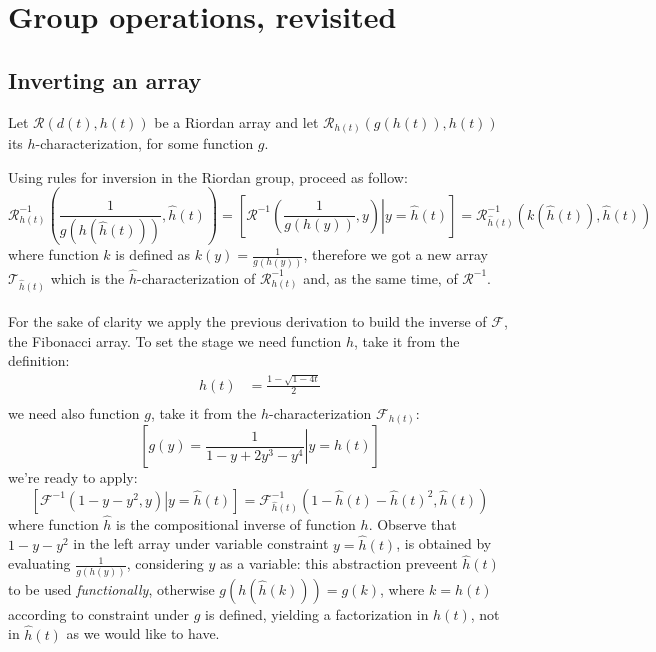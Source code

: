 

\section{Group operations, revisited}

\subsection{Inverting an array}

Let $\mathcal{R}\left(d(t),h(t)\right)$ be a Riordan array and let 
$\mathcal{R}_{h(t)}\left(g(h(t)),h(t)\right)$ its $h$-characterization, for some
function $g$. %
 
Using rules for inversion in the Riordan group, 
proceed as follow:
\begin{displaymath}
    \mathcal{R}_{h(t)}^{-1}\left(\frac{1}{g(h(\hat{h}(t)))},\hat{h}(t)\right)=
    \left[\mathcal{R}^{-1}\left(\left.\frac{1}{g(h(y))},y\right) \right| y = \hat{h}(t) \right]=
    \mathcal{R}_{\hat{h}(t)}^{-1}\left(k(\hat{h}(t)),\hat{h}(t)\right)
\end{displaymath}
where function $k$ is defined as $k(y)=\frac{1}{g(h(y))}$, 
therefore we got a new array $\mathcal{T}_{\hat{h}(t)}$ which is the $\hat{h}$-characterization
of $\mathcal{R}_{h(t)}^{-1}$ and, as the same time, of $\mathcal{R}^{-1}$.
\\\\
For the sake of clarity we apply the previous derivation to build the inverse of $\mathcal{F}$,
the Fibonacci array.  To set the stage we need function $h$, take it from the definition:
\begin{displaymath}
    \begin{split}
        h(t)&=\frac{1-\sqrt{1-4t}}{2}\\
    \end{split}
\end{displaymath}
we need also function $g$, take it from the $h$-characterization $\mathcal{F}_{h(t)}$:
\begin{displaymath}
    \left[g(y)=\left.\frac{1}{1-y+2y^3-y^4} \right| y=h(t)\right]
\end{displaymath}
we're ready to apply:
\begin{displaymath}
    \left[\mathcal{F}^{-1}\left.\left(1-y-y^2,y\right) \right| y = \hat{h}(t) \right]=
    \mathcal{F}_{\hat{h}(t)}^{-1}\left(1-\hat{h}(t)-\hat{h}(t)^2,\hat{h}(t)\right)
\end{displaymath}
where function $\hat{h}$ is the compositional inverse of function $h$. Observe that
$1-y-y^2$ in the left array under variable constraint $y=\hat{h}(t)$, is obtained by
evaluating $\frac{1}{g(h(y))}$, considering $y$ as a variable: this abstraction preveent 
$\hat{h}(t)$ to be used \emph{functionally}, otherwise $g(h(\hat{h}(k)))=g(k)$, where $k=h(t)$
according to constraint under $g$ is defined, yielding a factorization in $h(t)$, not in $\hat{h}(t)$
as we would like to have.

